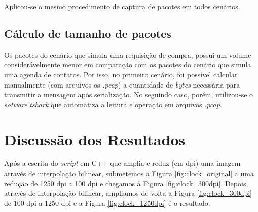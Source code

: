 \documentclass{article}
\begin{document}
Aplicou-se o mesmo procedimento de captura de pacotes em todos cenários.

\subsection{Cálculo de tamanho de pacotes}
Os pacotes do cenário que simula uma requisição de compra, possui um volume considerávelmente menor em comparação com os
pacotes do cenário que simula uma agenda de contatos. Por isso, no primeiro cenário, foi possível calcular manualmente (com arquivos os \textit{.pcap}) a quantidade de \textit{bytes} necessária para transmitir a mensagem após serialização. No seguindo caso, porém, utilizou-se o \textit{sotware} \textit{tshark} que automatiza a leitura e operação em arquivos \textit{.pcap}.



\section{Discussão dos Resultados}

Após a escrita do \textit{script} em C++ que amplia e reduz (em dpi) uma imagem através de interpolação bilinear, submetemos a Figura \ref{fig:clock_original}
a uma redução de 1250 dpi a 100 dpi e chegamos à Figura \ref{fig:clock_300dpi}. Depois, através de interpolação bilinear, ampliamos de volta a Figura \ref{fig:clock_300dpi}
de 100 dpi a 1250 dpi e a Figura \ref{fig:clock_1250dpi} é o resultado.

\end{document}
